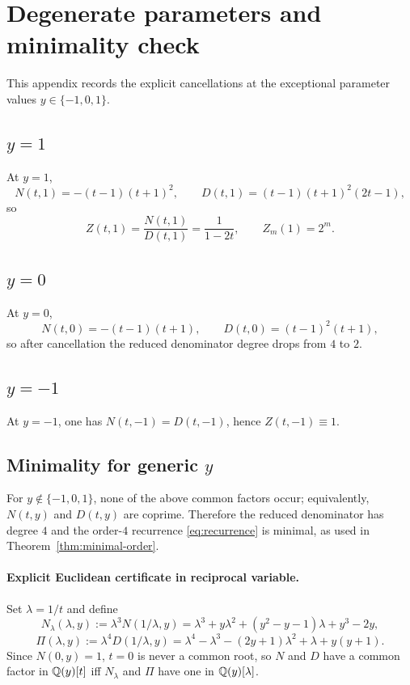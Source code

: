 \section{Degenerate parameters and minimality check}\label{app:degeneracies}

This appendix records the explicit cancellations at the exceptional parameter values \(y\in\{-1,0,1\}\).

\subsection{\texorpdfstring{\(y=1\)}{y=1}}

At \(y=1\),
\[
N(t,1)=-(t-1)(t+1)^2,
\qquad
D(t,1)=(t-1)(t+1)^2(2t-1),
\]
so
\[
Z(t,1)=\frac{N(t,1)}{D(t,1)}=\frac{1}{1-2t},
\qquad
Z_m(1)=2^m.
\]

\subsection{\texorpdfstring{\(y=0\)}{y=0}}

At \(y=0\),
\[
N(t,0)=-(t-1)(t+1),
\qquad
D(t,0)=(t-1)^2(t+1),
\]
so after cancellation the reduced denominator degree drops from \(4\) to \(2\).

\subsection{\texorpdfstring{\(y=-1\)}{y=-1}}

At \(y=-1\), one has \(N(t,-1)=D(t,-1)\), hence \(Z(t,-1)\equiv 1\).

\subsection{Minimality for generic \texorpdfstring{\(y\)}{y}}

For $y\notin\{-1,0,1\}$, none of the above common factors occur; equivalently, $N(t,y)$ and $D(t,y)$ are coprime.
Therefore the reduced denominator has degree $4$ and the order-$4$ recurrence \eqref{eq:recurrence} is minimal, as used in Theorem~\ref{thm:minimal-order}.

\paragraph{Explicit Euclidean certificate in reciprocal variable.}
Set \(\lambda=1/t\) and define
\[
N_{\lambda}(\lambda,y):=\lambda^3N(1/\lambda,y)=\lambda^3+y\lambda^2+(y^2-y-1)\lambda+y^3-2y,
\]
\[
\Pi(\lambda,y):=\lambda^4D(1/\lambda,y)=\lambda^4-\lambda^3-(2y+1)\lambda^2+\lambda+y(y+1).
\]
Since \(N(0,y)=1\), \(t=0\) is never a common root, so \(N\) and \(D\) have a common factor in \(\mathbb{Q}(y)[t]\) iff \(N_{\lambda}\) and \(\Pi\) have one in \(\mathbb{Q}(y)[\lambda]\).

